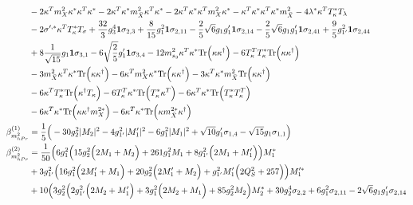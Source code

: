 {\begin{align}
 &-2 {\kappa^{T}  m_{X}^2  \kappa^*  \kappa^{T}  \kappa^*} -2 {\kappa^{T}  \kappa^*  m_{\bar{X}}^2  \kappa^{T}  \kappa^*} -2 {\kappa^{T}  \kappa^*  \kappa^{T}  m_{X}^2  \kappa^*} - {\kappa^{T}  \kappa^*  \kappa^{T}  \kappa^*  m_{\bar{X}}^2} -4 \lambda^* {\kappa^{T}  T_{\kappa}^*} T_{\lambda} \nonumber \\ 
 &-2 \sigma^{\prime,*} {\kappa^{T}  T_{\kappa}^*} T_{\sigma} +\frac{32}{3} g_{3}^{4} {\bf 1} \sigma_{2,3} +\frac{8}{15} g_{1}^{2} {\bf 1} \sigma_{2,11} -\frac{2}{5} \sqrt{6} g_1 g_1' {\bf 1} \sigma_{2,14} -\frac{2}{5} \sqrt{6} g_1 g_1' {\bf 1} \sigma_{2,41} +\frac{9}{5} g_{1'}^{2} {\bf 1} \sigma_{2,44} \nonumber \\ 
 &+8 \frac{1}{\sqrt{15}} g_1 {\bf 1} \sigma_{3,1} -6 \sqrt{\frac{2}{5}} g_1' {\bf 1} \sigma_{3,4} -12 m_{s_3}^2 {\kappa^{T}  \kappa^*} \mbox{Tr}\Big({\kappa  \kappa^{\dagger}}\Big) -6 {T_{\kappa}^{T}  T_{\kappa}^*} \mbox{Tr}\Big({\kappa  \kappa^{\dagger}}\Big) \nonumber \\ 
 &-3 {m_{\bar{X}}^2  \kappa^{T}  \kappa^*} \mbox{Tr}\Big({\kappa  \kappa^{\dagger}}\Big) -6 {\kappa^{T}  m_{X}^2  \kappa^*} \mbox{Tr}\Big({\kappa  \kappa^{\dagger}}\Big) -3 {\kappa^{T}  \kappa^*  m_{\bar{X}}^2} \mbox{Tr}\Big({\kappa  \kappa^{\dagger}}\Big) \nonumber \\ 
 &-6 {\kappa^{T}  T_{\kappa}^*} \mbox{Tr}\Big({\kappa^{\dagger}  T_{\kappa}}\Big) -6 {T_{\kappa}^{T}  \kappa^*} \mbox{Tr}\Big({T_{\kappa}^*  \kappa^{T}}\Big) -6 {\kappa^{T}  \kappa^*} \mbox{Tr}\Big({T_{\kappa}^*  T_{\kappa}^{T}}\Big) \nonumber \\ 
 &-6 {\kappa^{T}  \kappa^*} \mbox{Tr}\Big({\kappa  \kappa^{\dagger}  m_{X}^{2 *}}\Big) -6 {\kappa^{T}  \kappa^*} \mbox{Tr}\Big({\kappa  m_{\bar{X}}^{2 *}  \kappa^{\dagger}}\Big) \\ 
\beta_{m_{hPr}^2}^{(1)} & =  
\frac{1}{5} \Big(-30 g_{2}^{2} |M_2|^2  -4 g_{1'}^{2} |M_1'|^2  -6 g_{1}^{2} |M_1|^2  + \sqrt{10} g_1' \sigma_{1,4}  - \sqrt{15} g_1 \sigma_{1,1} \Big)\\ 
\beta_{m_{hPr}^2}^{(2)} & =  
\frac{1}{50} \Big(6 g_{1}^{2} \Big(15 g_{2}^{2} \Big(2 M_1  + M_2\Big) + 261 g_{1}^{2} M_1  + 8 g_{1'}^{2} \Big(2 M_1  + M_1'\Big)\Big)M_1^* \nonumber \\ 
 &+3 g_{1'}^{2} \Big(16 g_{1}^{2} \Big(2 M_1'  + M_1\Big) + 20 g_{2}^{2} \Big(2 M_1'  + M_2\Big) + g_{1'}^{2} M_1' \Big(2 Q_{S}^{2}  + 257\Big)\Big)M_1'^* \nonumber \\ 
 &+10 \Big(3 g_{2}^{2} \Big(2 g_{1'}^{2} \Big(2 M_2  + M_1'\Big) + 3 g_{1}^{2} \Big(2 M_2  + M_1\Big) + 85 g_{2}^{2} M_2 \Big)M_2^* +30 g_{2}^{4} \sigma_{2,2} +6 g_{1}^{2} \sigma_{2,11} -2 \sqrt{6} g_1 g_1' \sigma_{2,14} \nonumber \\ 

\end{align}}
